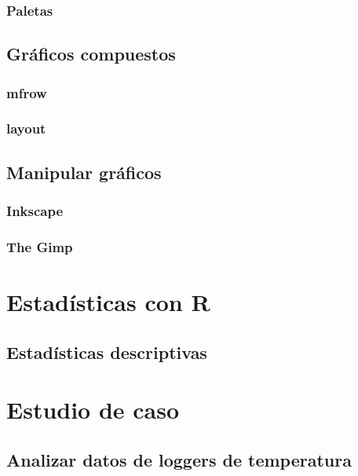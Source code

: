 \documentclass[]{book}
\begin{document}
\section{Paletas}\label{paletas}

\chapter{Gráficos compuestos}\label{graph3}

\section{mfrow}\label{mfrow}

\section{layout}\label{layout}

\chapter{Manipular gráficos}\label{graph4}

\section{Inkscape}\label{inkscape}

\section{The Gimp}\label{the-gimp}

\part{Estadísticas con R}\label{part-estadisticas-con-r}

\chapter{Estadísticas descriptivas}\label{stats1}

\part{Estudio de caso}\label{part-estudio-de-caso}

\chapter{Analizar datos de loggers de temperatura}\label{studyCase1}
\end{document}
